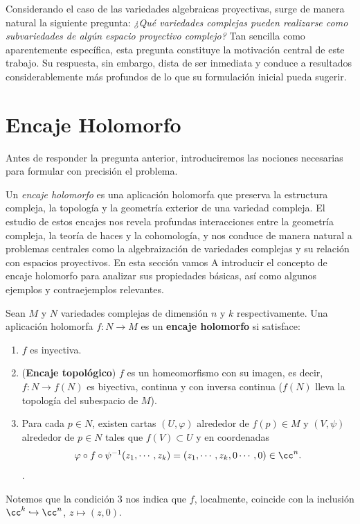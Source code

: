     Considerando el caso de las variedades algebraicas proyectivas, surge de manera natural la siguiente pregunta: \textit{¿Qué variedades complejas pueden realizarse como subvariedades de algún espacio proyectivo complejo?} Tan sencilla como aparentemente específica, esta pregunta constituye la motivación central de este trabajo. Su respuesta, sin embargo, dista de ser inmediata y conduce a resultados considerablemente más profundos de lo que su formulación inicial pueda sugerir.
    
\section{Encaje Holomorfo}
	
	Antes de responder la pregunta anterior, introduciremos las nociones necesarias para formular con precisión el problema.
	
	Un \textit{encaje holomorfo} es una aplicación holomorfa que preserva la estructura compleja, la topología y la geometría exterior de una variedad compleja. El estudio de estos encajes nos revela profundas interacciones entre la geometría compleja, la teoría de haces y la cohomología, y nos conduce de manera natural a problemas centrales como la algebraización de variedades complejas y su relación con espacios proyectivos. En esta sección vamos A introducir el concepto de encaje holomorfo para analizar sus propiedades básicas, así como algunos ejemplos y contraejemplos relevantes.
	    
    \begin{definition}
        Sean $M$ y $N$ variedades complejas de dimensión $n$ y $k$ respectivamente. Una aplicación holomorfa $f:N\to M$ es un \textbf{encaje holomorfo} si satisface:
        \begin{enumerate}
            \item $f$ es inyectiva.
            \item (\textbf{Encaje topológico}) $f$ es un homeomorfismo con su imagen, es decir, $f:N\to f(N)$ es biyectiva, continua y con inversa continua ($f(N)$ lleva la topología del subespacio de $M$).
            \item Para cada $p\in N$, existen cartas $(U,\varphi)$ alrededor de $f(p)\in M$ y $(V,\psi)$ alrededor de $p\in N$ tales que $f(V)\subset U$ y en coordenadas
            \begin{equation*}
                \varphi\circ f\circ\psi^{-1}(z_1,\cdots,z_k)=(z_1,\cdots,z_k,0\cdots,0)\in\cc^n.
            \end{equation*}.
        \end{enumerate}
        Notemos que la condición $3$ nos indica que $f$, localmente, coincide con la inclusión $\cc^k\hookrightarrow\cc^n$, $z\mapsto (z,0)$.
    \end{definition}

